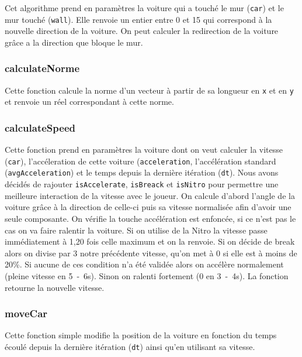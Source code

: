 \documentclass[11pt, final]{report}
\renewcommand{\tt}[1]{\texttt{#1}}
\begin{document}
Cet algorithme prend en paramètres la voiture qui a touché le mur (\tt{car}) et le mur touché (\tt{wall}). Elle renvoie un entier entre 0 et 15 qui correspond à la nouvelle direction de la voiture. On peut calculer la redirection de la voiture grâce a la direction que bloque le mur. 

\subsubsection{calculateNorme}


Cette fonction calcule la norme d'un vecteur à partir de sa longueur en \tt{x} et en \tt{y} et renvoie un réel correspondant à cette norme.
\\
\subsubsection{calculateSpeed}


Cette fonction prend en paramètres la voiture dont on veut calculer la vitesse (\tt{car}), l'accéleration de cette voiture (\tt{acceleration}, l'accélération standard (\tt{avgAcceleration}) et le temps depuis la dernière itération (\tt{dt}). Nous avons décidés de rajouter \tt{isAccelerate}, \tt{isBreack} et \tt{isNitro} pour permettre une meilleure interaction de la vitesse avec le joueur. On calcule d'abord l'angle de la voiture grâce à la direction de celle-ci puis sa vitesse normalisée afin d'avoir une seule composante.
On vérifie la touche accélération est enfoncée, si ce n'est pas le cas on va faire ralentir la voiture.
Si on utilise de la Nitro la vitesse passe immédiatement à 1,20 fois celle maximum et on la renvoie.
Si on décide de break alors on divise par 3 notre précédente vitesse, qu'on met à 0 si elle est à moins de 20\%.
Si aucune de ces condition n'a été validée alors on accélère normalement (pleine vitesse en 5~-~6s). Sinon on ralenti fortement (0 en 3~-~4s). La fonction retourne la nouvelle vitesse.
\\

\subsubsection{moveCar}



Cette fonction simple modifie la position de la voiture en fonction du temps écoulé depuis la dernière itération (\tt{dt}) ainsi qu'en utilisant sa vitesse.
\\
\end{document}

